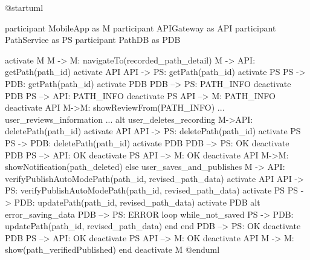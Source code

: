 @startuml

participant MobileApp as M
participant APIGateway as API 
participant PathService as PS
participant PathDB as PDB

activate M
M -> M: navigateTo(recorded_path_detail)
M -> API: getPath(path_id)
activate API
API -> PS: getPath(path_id)
activate PS
PS -> PDB: getPath(path_id)
activate PDB
PDB --> PS: PATH_INFO
deactivate PDB
PS --> API: PATH_INFO
deactivate PS
API --> M: PATH_INFO
deactivate API
M->M: showReviewFrom(PATH_INFO)
... user_reviews_information ... 
alt user_deletes_recording
M->API: deletePath(path_id)
activate API
API -> PS: deletePath(path_id)
activate PS
PS -> PDB: deletePath(path_id)
activate PDB
PDB --> PS: OK
deactivate PDB
PS --> API: OK
deactivate PS
API --> M: OK
deactivate API
M->M: showNotification(path_deleted)
else user_saves_and_publishes
M -> API: verifyPublishAutoModePath(path_id, revised_path_data)
activate API
API -> PS: verifyPublishAutoModePath(path_id, revised_path_data)
activate PS
PS -> PDB: updatePath(path_id, revised_path_data)
activate PDB
alt error_saving_data
PDB --> PS: ERROR
loop while_not_saved
PS -> PDB: updatePath(path_id, revised_path_data)
end
end
PDB --> PS: OK
deactivate PDB
PS --> API: OK
deactivate PS
API --> M: OK
deactivate API
M -> M: show(path_verifiedPublished)
end
deactivate M
@enduml